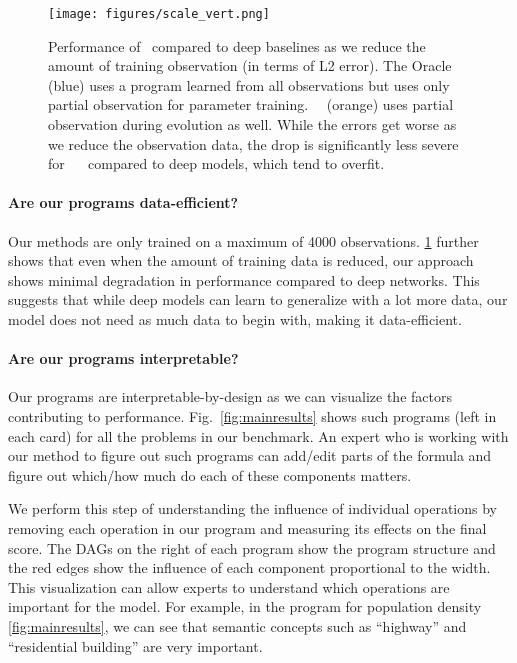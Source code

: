 \begin{figure}[ht]
    \centering
\texttt{[image: figures/scale\_vert.png]}         
\caption{Performance of \disciple~compared to deep baselines as we reduce the amount of training observation (in terms of L2 error). The Oracle (blue) uses a program learned from all observations but uses only partial observation for parameter training. ~\disciple~(orange) uses partial observation during evolution as well. While the errors get worse as we reduce the observation data, the drop is significantly less severe for ~\disciple~ compared to deep models, which tend to overfit.}
    \label{fig:scale}
\end{figure}


\paragraph{Are our programs data-efficient?} 
Our methods are only trained on a maximum of 4000 observations.
\cref{fig:scale} further shows that even when the amount of training data is reduced, our approach shows minimal degradation in performance compared to deep networks.
This suggests that while deep models can learn to generalize with a lot more data, our model does not need as much data to begin with, making it data-efficient.


\paragraph{Are our programs interpretable?} Our programs are interpretable-by-design as we can visualize the factors contributing to performance. 
Fig.~\ref{fig:mainresults} shows such programs (left in each card) for all the problems in our benchmark. 
An expert who is working with our method to figure out such programs can add/edit parts of the formula and figure out which/how much do each of these components matters. 

We perform this step of understanding the influence of individual operations by removing each operation in our program and measuring its effects on the final score. 
The DAGs on the right of each program show the program structure and the red edges show the influence of each component proportional to the width. 
This visualization can allow experts to understand which operations are important for the model.
For example, in the program for population density \cref{fig:mainresults}, we can see that semantic concepts such as ``highway'' and ``residential building'' are very important.






